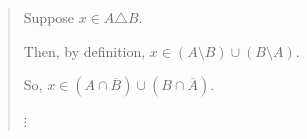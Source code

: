 \begin{enumerate}
{ \begin{quote} 
 Suppose $x \in  A \triangle B$.  
 
Then, by definition, $x \in (A\setminus B) \cup (B\setminus A)$.
 
 So, $x \in (A \cap \overline{B}) \cup (B \cap \overline{A})$.
   
\begin{center}
$\vdots$
\end{center}

\end{quote}
}

\wbvfill

\workbookpagebreak

\end{enumerate}



